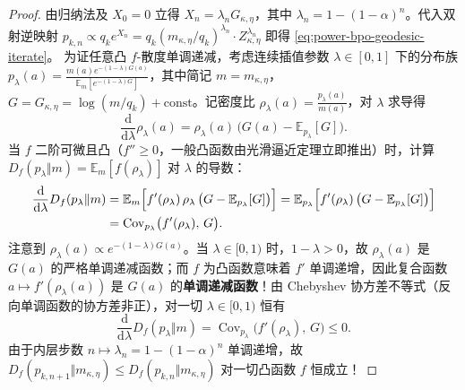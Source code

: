 \documentclass[lang=cn,scheme=chinese,openany]{../book/elegantbook}
\newcommand{\E}{\mathbb E}
\begin{document}
\begin{proof}
由归纳法及 $X_0=0$ 立得 $X_n=\lambda_n G_{\kappa,\eta}$，其中 $\lambda_n=1-(1-\alpha)^n$。代入双射逆映射 $p_{k,n}\propto q_k e^{X_n}=q_k(m_{\kappa,\eta}/q_k)^{\lambda_n}\cdot Z_{\kappa,\eta}^{\lambda_n}$ 即得 \cref{eq:power-bpo-geodesic-iterate}。
为证任意凸 $f$-散度单调递减，考虑连续插值参数 $\lambda\in[0,1]$ 下的分布族 $p_\lambda(a)=\frac{m(a)e^{-(1-\lambda)G(a)}}{\E_m[e^{-(1-\lambda)G}]}$，其中简记 $m=m_{\kappa,\eta}$，$G=G_{\kappa,\eta}=\log(m/q_k)+\text{const}$。记密度比 $\rho_\lambda(a)=\frac{p_\lambda(a)}{m(a)}$，对 $\lambda$ 求导得
\begin{equation}
 \frac{\mathrm d}{\mathrm d\lambda}\rho_\lambda(a)
 = \rho_\lambda(a)\,\bigl(G(a)-\E_{p_\lambda}[G]\bigr).
\end{equation}
当 $f$ 二阶可微且凸（$f''\ge 0$，一般凸函数由光滑逼近定理立即推出）时，计算 $D_f(p_\lambda\Vert m)=\E_m[f(\rho_\lambda)]$ 对 $\lambda$ 的导数：
\begin{align}
 \frac{\mathrm d}{\mathrm d\lambda}D_f(p_\lambda\Vert m)
 &= \E_m\Bigl[f'(\rho_\lambda)\,\rho_\lambda\,\bigl(G-\E_{p_\lambda}[G]\bigr)\Bigr]
 = \E_{p_\lambda}\Bigl[f'(\rho_\lambda)\,\bigl(G-\E_{p_\lambda}[G]\bigr)\Bigr] \nonumber\\
 &= \operatorname{Cov}_{p_\lambda}\bigl(f'(\rho_\lambda),\,G\bigr).
 \label{eq:df-lambda-derivative}
\end{align}
注意到 $\rho_\lambda(a)\propto e^{-(1-\lambda)G(a)}$。当 $\lambda\in[0,1)$ 时，$1-\lambda>0$，故 $\rho_\lambda(a)$ 是 $G(a)$ 的严格单调递减函数；而 $f$ 为凸函数意味着 $f'$ 单调递增，因此复合函数 $a\mapsto f'(\rho_\lambda(a))$ 是 $G(a)$ 的\textbf{单调递减函数}！由 Chebyshev 协方差不等式（反向单调函数的协方差非正），对一切 $\lambda\in[0,1)$ 恒有
\begin{equation}
 \frac{\mathrm d}{\mathrm d\lambda}D_f(p_\lambda\Vert m)
 = \operatorname{Cov}_{p_\lambda}\bigl(f'(\rho_\lambda),\,G\bigr) \le 0.
\end{equation}
由于内层步数 $n\mapsto \lambda_n=1-(1-\alpha)^n$ 单调递增，故 $D_f(p_{k,n+1}\Vert m_{\kappa,\eta})\le D_f(p_{k,n}\Vert m_{\kappa,\eta})$ 对一切凸函数 $f$ 恒成立！
\end{proof}
\end{document}
